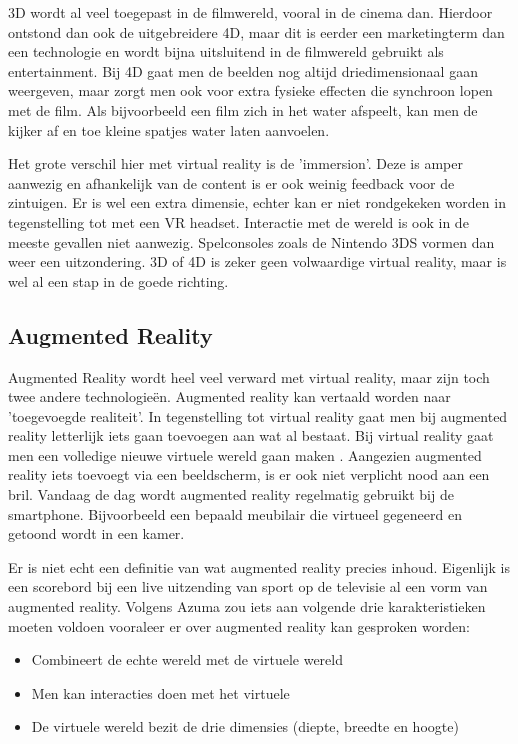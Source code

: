 3D wordt al veel toegepast in de filmwereld, vooral in de cinema dan. Hierdoor ontstond dan ook de uitgebreidere 4D, maar dit is eerder een marketingterm dan een technologie en wordt bijna uitsluitend in de filmwereld gebruikt als entertainment. Bij 4D gaat men de beelden nog altijd driedimensionaal gaan weergeven, maar zorgt men ook voor extra fysieke effecten die synchroon lopen met de film. Als bijvoorbeeld een film zich in het water afspeelt, kan men de kijker af en toe kleine spatjes water laten aanvoelen.

Het grote verschil hier met virtual reality is de 'immersion'. Deze is amper aanwezig en afhankelijk van de content is er ook weinig feedback voor de zintuigen. Er is wel een extra dimensie, echter kan er niet rondgekeken worden in tegenstelling tot met een VR headset. Interactie met de wereld is ook in de meeste gevallen niet aanwezig. Spelconsoles zoals de Nintendo 3DS vormen dan weer een uitzondering. 3D of 4D is zeker geen volwaardige virtual reality, maar is wel al een stap in de goede richting. \autocite{Peniche2016}

\subsection{Augmented Reality}
\label{subsec:augmented-reality}
Augmented Reality wordt heel veel verward met virtual reality, maar zijn toch twee andere technologieën. Augmented reality kan vertaald worden naar 'toegevoegde realiteit'. In tegenstelling tot virtual reality gaat men bij augmented reality letterlijk iets gaan toevoegen aan wat al bestaat. Bij virtual reality gaat men een volledige nieuwe virtuele wereld gaan maken \autocite{Augment2015}. Aangezien augmented reality iets toevoegt via een beeldscherm, is er ook niet verplicht nood aan een bril. Vandaag de dag wordt augmented reality regelmatig gebruikt bij de smartphone. Bijvoorbeeld een bepaald meubilair die virtueel gegeneerd en getoond wordt in een kamer.

Er is niet echt een definitie van wat augmented reality precies inhoud. Eigenlijk is een scorebord bij een live uitzending van sport op de televisie al een vorm van augmented reality. Volgens Azuma \autocite{Azuma1997} zou iets aan volgende drie karakteristieken moeten voldoen vooraleer er over augmented reality kan gesproken worden:

\begin{itemize}
	\item Combineert de echte wereld met de virtuele wereld
	\item Men kan interacties doen met het virtuele
	\item De virtuele wereld bezit de drie dimensies (diepte, breedte en hoogte)
\end{itemize}


